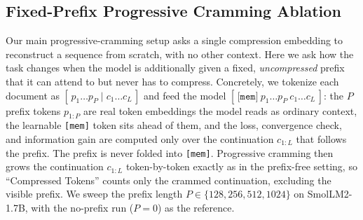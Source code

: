 \begin{table}[t]
    \centering
    \caption{Tokens-per-stage ablation on SmolLM2-1.7B. We vary the progressive step $\Delta$---the number of target tokens appended to the prefix each time a stage converges---over $\{1, 2, 4, 8, 16, 32, 64, 128\}$; $\Delta = 1$ (grow one token at a time) is the reference. All runs share the same progressive eval configuration (PG19, sequence length $4096$, learning rate $0.1$, $50$ samples). ``Compressed Tokens'' is the largest \emph{converged} prefix length $n$ (the final non-converged stage is excluded, so it is not inflated by $\Delta$), ``Trajectory Length'' is $L_{\text{traj}}$, ``PCA 99\%'' is the number of principal components explaining 99\% of trajectory variance, and ``Steps to Converge'' is the cumulative optimization steps spent to reach that last converged token. The final three rows (\emph{geometric growth}) replace the fixed step with a doubling schedule and one of three back-off strategies---bisection, bisection with warm-restore of the last converged state, or a linear $+1$ walk with warm-restore---each locating the horizon in far fewer stages while still guaranteeing the returned prefix is fully reconstructed, though at a compressed-token count below the $\Delta = 1$ reference.}
    \label{tab:added_tokens_ablation}
    \begin{small}
    
\end{small}
\vskip -0.1in
\end{table}


\subsection{Fixed-Prefix Progressive Cramming Ablation}
\label{app:prefix_ablation}

Our main progressive-cramming setup asks a single compression embedding to reconstruct a sequence from scratch, with no other context. Here we ask how the task changes when the model is additionally given a fixed, \emph{uncompressed} prefix that it can attend to but never has to compress. Concretely, we tokenize each document as $[\,p_1 \dots p_P \mid c_1 \dots c_L\,]$ and feed the model $[\,\texttt{[mem]}\ p_1 \dots p_P\ c_1 \dots c_L\,]$: the $P$ prefix tokens $p_{1:P}$ are real token embeddings the model reads as ordinary context, the learnable \texttt{[mem]} token sits ahead of them, and the loss, convergence check, and information gain are computed only over the continuation $c_{1:L}$ that follows the prefix. The prefix is never folded into \texttt{[mem]}. Progressive cramming then grows the continuation $c_{1:L}$ token-by-token exactly as in the prefix-free setting, so ``Compressed Tokens'' counts only the crammed continuation, excluding the visible prefix. We sweep the prefix length $P \in \{128, 256, 512, 1024\}$ on SmolLM2-1.7B, with the no-prefix run ($P=0$) as the reference.

